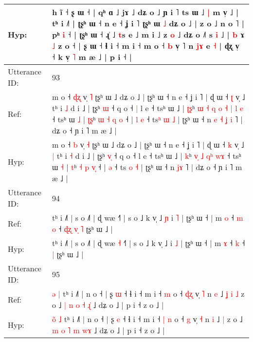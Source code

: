 \documentclass[10pt]{article}
\DeclareRobustCommand{\hl}[1]{{\textcolor{red}{#1}}}
\begin{document}
\begin{longtable}{ll}
 \\
Hyp: & h ĩ ˧ \hl{}ʂ\hl{} ɯ ˧ | qʰ ɑ ˩ jɤ ˩ dʑ o ˩ ɲ i ˥ ts ɯ ˩\hl{ }\hl{|} m v̩ ˩ | tʰ i ˩˥ | ʈʂʰ ɯ ˧ n e ˧ ʝ i ˥\hl{}\hl{} ʈʂʰ ɯ \hl{˩} dʑ o ˩ | z o ˩ n o ˥ | pʰ \hl{i} ˧ | ʈʂʰ ɯ ˧ ɻ̍ ˩ \hl{t}s e ˩\hl{}\hl{} m i ˩ z \hl{o} ˩ dʑ o ˩˥\hl{}\hl{} s \hl{i} ˩ |\hl{}\hl{}\hl{}\hl{}\hl{}\hl{}\hl{} \hl{b} ɤ \hl{˩} z o ˧ | ʂ ɯ ˧ ɬ i ˧ m i ˧ m o ˧ \hl{}\hl{b} v̩ ˥ n\hl{ }\hl{j}\hl{ɤ} e \hl{˧} | ɖʐ v̩ ˧ k v̩ \hl{˥} m æ ˩ | p i ˧ |
 \\
\midrule
Utterance ID: & 93 \\
Ref: & m o ˧ \hl{ɖ}\hl{ʐ} v̩ \hl{˥} ʈʂʰ ɯ ˩ dʑ o ˩ | ʈʂʰ ɯ ˧ n e ˧ ʝ i ˥ | ɖ ɯ ˧ \hl{ʈ} v̩ ˩\hl{}\hl{} tʰ i \hl{˩} d i ˩ | ʈʂʰ \hl{}\hl{ɯ} ˧ q o ˧\hl{ }\hl{|} l e ˧ tsʰ ɯ ˩ | \hl{ʈ}\hl{ʂ}ʰ\hl{ }\hl{ɯ} \hl{˧}\hl{ }\hl{q} \hl{o} \hl{˧}\hl{ }\hl{|} \hl{l}\hl{ }\hl{e} ˧ tsʰ ɯ \hl{˩} | \hl{ʈ}\hl{ʂ}ʰ \hl{ɯ} \hl{˧} \hl{q}\hl{ }\hl{o} ˧ |\hl{ }\hl{l} \hl{e} ˧ ts\hl{ʰ} \hl{ɯ} \hl{˩} | ʈʂʰ ɯ ˧ n\hl{ }\hl{e}\hl{ }\hl{˧} \hl{ʝ}\hl{ }\hl{i} ˥ | dʑ o ˧ ɲ i ˥ m æ ˩ |
 \\
Hyp: & m o ˧ \hl{}\hl{b} v̩ \hl{˧} ʈʂʰ ɯ ˩ dʑ o ˩ | ʈʂʰ ɯ ˧ n e ˧ ʝ i ˥ | ɖ ɯ ˧ \hl{k} v̩ ˩\hl{ }\hl{|} tʰ i \hl{˧} d i ˩ | ʈʂʰ \hl{v}\hl{̩} ˧ q o ˧\hl{}\hl{} l e ˧ tsʰ ɯ ˩ | \hl{}\hl{k}ʰ\hl{}\hl{} \hl{}\hl{v}\hl{̩} \hl{˩} \hl{}\hl{q}\hl{ʰ} \hl{}\hl{w}\hl{ɤ} ˧ tsʰ ɯ \hl{˧} | \hl{}\hl{t}ʰ \hl{˧} \hl{p} \hl{}\hl{v}\hl{̩} ˧ |\hl{}\hl{} \hl{ə} ˧ ts\hl{} \hl{o} \hl{˧} | ʈʂʰ ɯ ˧ n\hl{}\hl{}\hl{}\hl{} \hl{}\hl{j}\hl{ɤ} ˥ | dʑ o ˧ ɲ i ˥ m æ ˩ |
 \\
\midrule
Utterance ID: & 94 \\
Ref: & tʰ i ˩˥ | s o ˩˥ | ɖ wæ\hl{}\hl{} ˧˥ | s o ˩ k v̩ ˩\hl{ }\hl{ɲ} i \hl{˥} | ʈʂʰ ɯ ˧ | m \hl{o} ˧\hl{ }\hl{m} \hl{o} ˧\hl{ }\hl{ɖ}\hl{ʐ}\hl{ }\hl{v}\hl{̩} \hl{˥} ʈʂʰ ɯ ˩ |
 \\
Hyp: & tʰ i ˩˥ | s o ˩˥ | ɖ wæ\hl{ }\hl{˧} ˧˥ | s o ˩ k v̩ ˩\hl{}\hl{} i \hl{˩} | ʈʂʰ ɯ ˧ | m \hl{ɤ} ˧\hl{}\hl{} \hl{k} ˧\hl{}\hl{}\hl{}\hl{}\hl{}\hl{} \hl{|} ʈʂʰ ɯ ˩ |
 \\
\midrule
Utterance ID: & 95 \\
Ref: & \hl{}\hl{ə} \hl{|} tʰ i ˩˥ | n o ˧ | ʂ \hl{ɯ} ˧ ɬ i ˧ m i ˧\hl{}\hl{} \hl{m} o ˧ \hl{ɖ}\hl{ʐ} v̩ \hl{˥} n \hl{e} ˩\hl{ }\hl{ʝ}\hl{ }\hl{i} \hl{˩} z o ˩ \hl{|} \hl{n} \hl{o} \hl{˧} \hl{ɻ}\hl{̍} ˩ dʑ o ˩ | p i ˧ z o ˩ |
 \\
Hyp: & \hl{o}\hl{̃} \hl{˩} tʰ i ˩˥ | n o ˧ | ʂ \hl{e} ˧ ɬ i ˧ m i ˧\hl{ }\hl{|} \hl{n} o ˧ \hl{}\hl{g} v̩ \hl{˧} n \hl{i} ˩\hl{}\hl{}\hl{}\hl{} \hl{|} z o ˩ \hl{m} \hl{o} \hl{˥} \hl{m} \hl{w}\hl{ɤ} ˩ dʑ o ˩ | p i ˧ z o ˩ |

\end{longtable}
\end{document}
